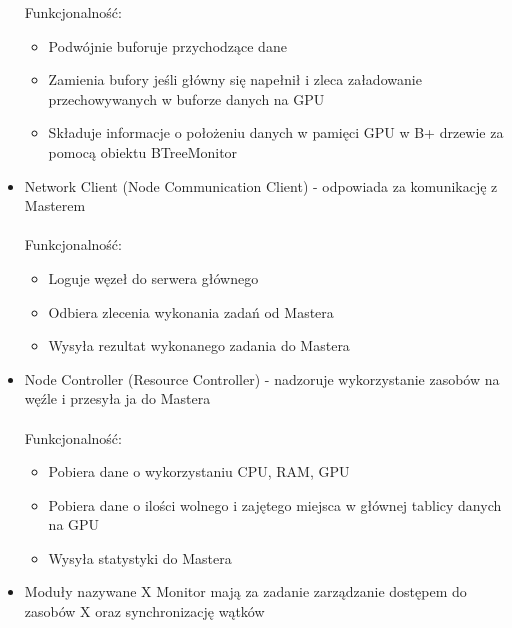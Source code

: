 \documentclass[paper=a4, fontsize=11pt]{scrartcl} %
\numberwithin{equation}{section} %
\numberwithin{figure}{section} %
\numberwithin{table}{section} %
\begin{document}
\begin{itemize}
				Funkcjonalność: 
				\begin{itemize}
					\item Podwójnie buforuje przychodzące dane
					\item Zamienia bufory jeśli główny się napełnił i zleca załadowanie przechowywanych w buforze danych na GPU
					\item Składuje informacje o położeniu danych w pamięci GPU w B+ drzewie za pomocą obiektu BTreeMonitor
				\end{itemize}
			\item Network Client (Node Communication Client) - odpowiada za komunikację z Masterem \\ \\
				Funkcjonalność: 
				\begin{itemize}
					\item Loguje węzeł do serwera głównego
					\item Odbiera zlecenia wykonania zadań od Mastera
					\item Wysyła rezultat wykonanego zadania do Mastera
				\end{itemize}
			\item Node Controller (Resource Controller) - nadzoruje wykorzystanie zasobów na węźle i przesyła ja do Mastera \\ \\
				Funkcjonalność: 
				\begin{itemize}
					\item Pobiera dane o wykorzystaniu CPU, RAM, GPU
					\item Pobiera dane o ilości wolnego i zajętego miejsca w głównej tablicy danych na GPU
					\item Wysyła statystyki do Mastera
				\end{itemize}
			\item Moduły nazywane X Monitor mają za zadanie zarządzanie dostępem do zasobów X oraz synchronizację wątków
		\end{itemize}
\end{document}
